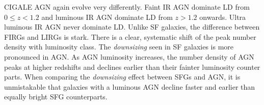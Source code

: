 CIGALE AGN again evolve very differently. Faint IR AGN dominate LD from $0 \leq z < 1.2$ and luminous IR AGN dominate LD from $z>1.2$ onwards. Ultra luminous IR AGN never dominate LD. Unlike SF galaxies, the difference between FIRGs and LIRGs is stark. There is a clear, systematic shift of the peak number density with luminosity class. The \textit{downsizing} seen in SF galaxies is more pronounced in AGN. As AGN luminosity increases, the number density of AGN peaks at higher redshifts and declines earlier than their fainter luminosity counter parts. When comparing the \textit{downsizing} effect between SFGs and AGN, it is unmistakable that galaxies with a luminous AGN decline faster and earlier than equally bright SFG counterparts.






